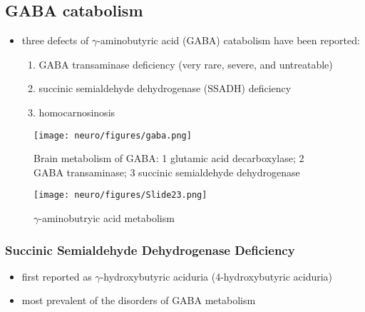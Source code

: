 \documentclass[12pt]{scrartcl}
\begin{document}
\subsection{GABA catabolism}
\label{sec:orgbc3fd18}
\begin{itemize}
\item three defects of \(\gamma\)-aminobutyric acid (GABA) catabolism have been reported:
\begin{enumerate}
\item GABA transaminase deficiency (very rare, severe, and untreatable)
\item succinic semialdehyde dehydrogenase (SSADH) deficiency
\item homocarnosinosis
\end{enumerate}
\end{itemize}

\begin{figure}[htbp]
\centering
\texttt{[image: neuro/figures/gaba.png]}
\caption{\label{fig:orgd23ead7}Brain metabolism of GABA: 1 glutamic acid decarboxylase; 2 GABA transaminase; 3 succinic semialdehyde dehydrogenase}
\end{figure}

\begin{figure}[htbp]
\centering
\texttt{[image: neuro/figures/Slide23.png]}
\caption{\label{fig:orgfa8143a}\(\gamma\)-aminobutryic acid metabolism}
\end{figure}

\subsubsection{Succinic Semialdehyde Dehydrogenase Deficiency}
\label{sec:org055abaa}
\begin{itemize}
\item first reported as \(\gamma\)-hydroxybutyric aciduria (4-hydroxybutyric
aciduria)
\item most prevalent of the disorders of GABA metabolism
\end{itemize}
\end{document}
